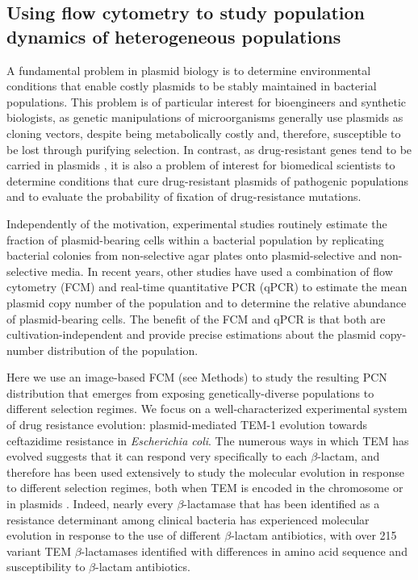 \documentclass[fleqn,12pt]{wlscirep}
\begin{document}


\subsection{Using flow cytometry to study population dynamics of heterogeneous populations}
A fundamental problem in plasmid biology is to determine environmental conditions that enable costly plasmids to be stably maintained in bacterial populations\cite{Harrison2015,loftie2016evolutionary,porse2016survival}. This problem is of particular interest for bioengineers and synthetic biologists, as genetic manipulations of microorganisms generally use plasmids as cloning vectors, despite being metabolically costly and, therefore, susceptible to be lost through purifying selection.  In contrast, as drug-resistant genes tend to be carried in plasmids \cite{alekshun2007molecular}, it is also a problem of interest for biomedical scientists to determine conditions that cure drug-resistant plasmids of pathogenic populations\cite{boucher2009bad} and to evaluate the probability of fixation of drug-resistance mutations\cite{ref}.  

Independently of the motivation, experimental studies routinely estimate the fraction of plasmid-bearing cells within a bacterial population by replicating bacterial colonies from non-selective agar plates onto plasmid-selective and non-selective media. 
In recent years, other studies have used a combination of flow cytometry (FCM) and real-time quantitative PCR (qPCR) to estimate the mean plasmid copy number of the population\cite{ng2010plasmid} and to determine the relative abundance of plasmid-bearing cells\cite{bahl2004quantification}.  The benefit of the FCM and qPCR is that both are cultivation-independent and provide precise estimations about the plasmid copy-number distribution of the population. 

Here we use an image-based FCM (see Methods) to study the resulting PCN distribution that emerges from exposing genetically-diverse populations to different selection regimes. We focus on a well-characterized experimental system of drug resistance evolution: plasmid-mediated TEM-1 evolution towards ceftazidime resistance in {\em Escherichia coli}. The numerous ways in which TEM has evolved suggests that it can respond very specifically to each $\beta$-lactam, and therefore has been used extensively to study the molecular evolution in response to different selection regimes, both when TEM is encoded in the chromosome \cite{Barlow2002, Barlow2003} or in plasmids \cite{Rodriguez2018,santos2017naturally}.  
Indeed, nearly every $\beta$-lactamase that has been identified as a resistance determinant among clinical bacteria has experienced molecular evolution in response to the use of different $\beta$-lactam antibiotics, with over 215 variant TEM $\beta$-lactamases identified with differences in amino acid sequence and susceptibility to $\beta$-lactam antibiotics\cite{Barlow2002}.
\end{document}
